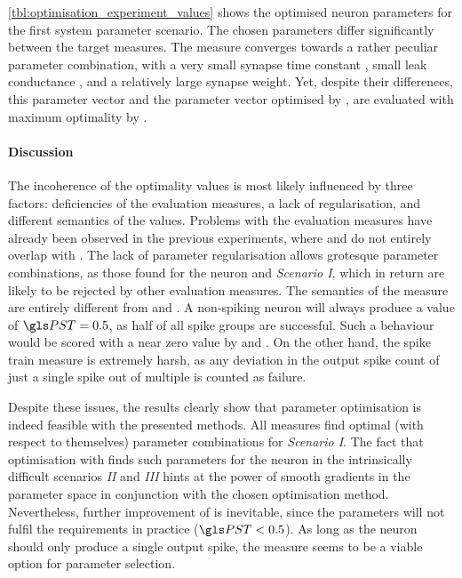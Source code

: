 \cref{tbl:optimisation_experiment_values} shows the optimised \LIF neuron parameters for the first system parameter scenario. The chosen parameters differ significantly between the target measures. The \SGSO measure converges towards a rather peculiar parameter combination, with a very small synapse time constant \TauE, small leak conductance \Gl, and a relatively large synapse weight. Yet, despite their differences, this parameter vector and the parameter vector optimised by \STII, are evaluated with maximum optimality by \STII.

\paragraph{Discussion}
The incoherence of the optimality values is most likely influenced by three factors: deficiencies of the evaluation measures, a lack of regularisation, and different semantics of the values. Problems with the evaluation measures have already been observed in the previous experiments, where \SGSO and \SGMO do not entirely overlap with \STII. The lack of parameter regularisation allows grotesque parameter combinations, as those found for the \LIF neuron and \emph{Scenario I}, which in return are likely to be rejected by other evaluation measures. The semantics of the \STII measure are entirely different from \SGSO and \SGMO. A non-spiking neuron will always produce a value of $\PST = 0.5$, as half of all spike groups are successful. Such a behaviour would be scored with a near zero value by \SGSO and \SGMO. On the other hand, the spike train measure is extremely harsh, as any deviation in the output spike count of just a single spike out of multiple is counted as failure.

Despite these issues, the results clearly show that parameter optimisation is indeed feasible with the presented methods. All measures find optimal (with respect to themselves) parameter combinations for \emph{Scenario I}. The fact that optimisation with \SGMO finds such parameters for the \LIF neuron in the intrinsically difficult scenarios \emph{II} and \emph{III} hints at the power of smooth gradients in the parameter space in conjunction with the chosen optimisation method. Nevertheless, further improvement of \SGMO is inevitable, since the parameters will not fulfil the \BiNAM requirements in practice ($\PST < 0.5$). As long as the neuron should only produce a single output spike, the \SGSO measure seems to be a viable option for parameter selection.

